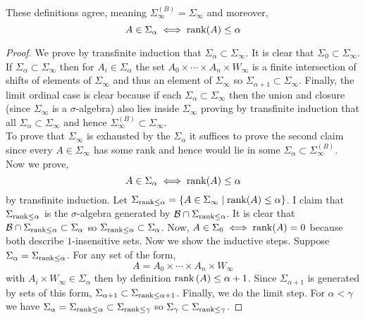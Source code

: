 \documentclass[12pt]{article}
\newcommand{\B}{\mathcal{B}}
\begin{document}
\begin{prop}
These definitions agree, meaning $\Sigma^{(B)}_{\infty} = \Sigma_{\infty}$ and moreover,
\[ A \in \Sigma_{\alpha} \iff \operatorname{\mathrm{rank}}(A) \le \alpha \]
\end{prop}

\begin{proof}
We prove by transfinite induction that $\Sigma_{\alpha} \subset \Sigma_{\infty}$. It is clear that $\Sigma_0 \subset \Sigma_{\infty}$. If $\Sigma_{\alpha} \subset \Sigma_{\infty}$ then for $A_i \in \Sigma_\alpha$ the set $A_0 \times \cdots \times A_n \times W_{\infty}$ is a finite intersection of shifts of elements of $\Sigma_{\infty}$ and thus an element of $\Sigma_{\infty}$ so $\Sigma_{\alpha+1} \subset \Sigma_{\infty}$. Finally, the limit ordinal case is clear because if each $\Sigma_\alpha \subset \Sigma_{\infty}$ then the union and closure (since $\Sigma_{\infty}$ is a $\sigma$-algebra) also lies inside $\Sigma_{\infty}$ proving by transfinite induction that all $\Sigma_{\alpha} \subset \Sigma_{\infty}$ and hence $\Sigma_{\infty}^{(B)} \subset \Sigma_{\infty}$.
\bigskip\\
To prove that $\Sigma_{\infty}$ is exhausted by the $\Sigma_\alpha$ it suffices to prove the second claim since every $A \in \Sigma_{\infty}$ has some rank and hence would lie in some $\Sigma_{\alpha} \subset \Sigma_{\infty}^{(B)}$.
\bigskip\\
Now we prove,
\[ A \in \Sigma_\alpha \iff \operatorname{\mathrm{rank}}(A) \le \alpha \]
by transfinite induction. Let $\Sigma_{\operatorname{\mathrm{rank}} \le \alpha} = \{ A \in \Sigma_{\infty} \mid \operatorname{\mathrm{rank}}(A) \le \alpha \}$. I claim that $\Sigma_{\operatorname{\mathrm{rank}} \le \alpha}$ is the $\sigma$-algebra generated by $\B \cap \Sigma_{\rank \le \alpha}$. It is clear that $\B \cap \Sigma_{\rank \le \alpha} \subset \Sigma_{\alpha}$ so $\Sigma_{\operatorname{\mathrm{rank}} \le \alpha} \subset \Sigma_{\alpha}$. Now, $A \in \Sigma_0 \iff \operatorname{\mathrm{rank}}(A) = 0$ because both describe $1$-insensitive sets. Now we show the inductive steps.  Suppose $\Sigma_{\alpha} = \Sigma_{\operatorname{\mathrm{rank}} \le \alpha}$. For any set of the form,
\[ A = A_0 \times \cdots \times A_n \times W_{\infty} \]
with $A_i \times W_{\infty} \in \Sigma_{\alpha}$ then by definition $\operatorname{\mathrm{rank}}{(A)} \le \alpha + 1$. Since $\Sigma_{\alpha+1}$ is generated by sets of this form, $\Sigma_{\alpha+1} \subset \Sigma_{\operatorname{\mathrm{rank}} \le \alpha + 1}$. Finally, we do the limit step. For $\alpha < \gamma$ we have $\Sigma_{\alpha} = \Sigma_{\operatorname{\mathrm{rank}} \le \alpha} \subset \Sigma_{\operatorname{\mathrm{rank}} \le \gamma}$ so $\Sigma_{\gamma} \subset \Sigma_{\operatorname{\mathrm{rank}} \le \gamma}$.
\end{proof}
\end{document}
